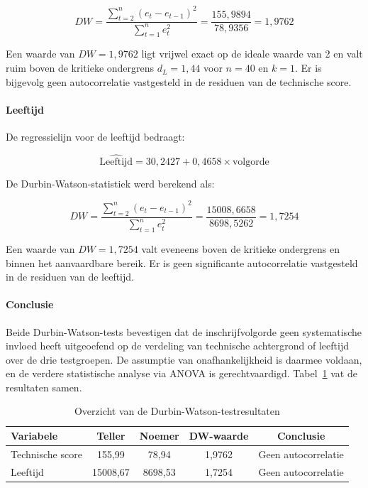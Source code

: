 \[
DW = \frac{\sum_{t=2}^{n}(e_t - e_{t-1})^2}{\sum_{t=1}^{n}e_t^2} = \frac{155{,}9894}{78{,}9356} = 1{,}9762
\]

Een waarde van $DW = 1{,}9762$ ligt vrijwel exact op de ideale waarde van 2 en valt ruim boven de kritieke ondergrens $d_L = 1{,}44$ voor $n=40$ en $k=1$. Er is bijgevolg geen autocorrelatie vastgesteld in de residuen van de technische score.

\paragraph{Leeftijd}

De regressielijn voor de leeftijd bedraagt:

\[
\widehat{\text{Leeftijd}} = 30{,}2427 + 0{,}4658 \times \text{volgorde}
\]

De Durbin-Watson-statistiek werd berekend als:

\[
DW = \frac{\sum_{t=2}^{n}(e_t - e_{t-1})^2}{\sum_{t=1}^{n}e_t^2} = \frac{15008{,}6658}{8698{,}5262} = 1{,}7254
\]

Een waarde van $DW = 1{,}7254$ valt eveneens boven de kritieke ondergrens en binnen het aanvaardbare bereik. Er is geen significante autocorrelatie vastgesteld in de residuen van de leeftijd.

\paragraph{Conclusie}

Beide Durbin-Watson-tests bevestigen dat de inschrijfvolgorde geen systematische invloed heeft uitgeoefend op de verdeling van technische achtergrond of leeftijd over de drie testgroepen. De assumptie van onafhankelijkheid is daarmee voldaan, en de verdere statistische analyse via ANOVA is gerechtvaardigd. Tabel~\ref{tab:dw-resultaten} vat de resultaten samen.

\begin{table}[h]
  \centering
  \caption[Durbin-Watson testresultaten]{Overzicht van de Durbin-Watson-testresultaten}
  \label{tab:dw-resultaten}
  \begin{tabular}{lcccc}
    \hline
    \textbf{Variabele} & \textbf{Teller} & \textbf{Noemer} & \textbf{DW-waarde} & \textbf{Conclusie} \\
    \hline
    Technische score & 155,99 & 78,94 & 1,9762 & Geen autocorrelatie \\
    Leeftijd         & 15008,67 & 8698,53 & 1,7254 & Geen autocorrelatie \\
    \hline
  \end{tabular}
\end{table}

